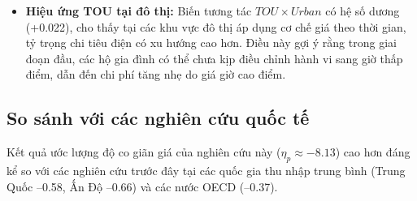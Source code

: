 \documentclass[12pt,a4paper,oneside]{article}
\begin{document}
\begin{itemize}
\begin{figure}[H]
			\caption{Phân tích chi tiết tác động của nhiệt độ và mùa vụ đến tiêu dùng điện}
			\label{fig:climate_impact_comprehensive}
		\end{figure}
		
	\noindent \textit{Nhận xét và đánh giá chi tiết:}
	\begin{itemize}
		\item \textbf{Quan hệ phi tuyến (Hình \ref{fig:temp_relation_nonlinear}):} Đường hồi quy bậc hai (màu đỏ) với khoảng tin cậy 95\% minh họa rõ nét mối quan hệ hình chữ U ngược. Tỷ trọng chi tiêu điện tăng dần khi nhiệt độ tăng, phản ánh nhu cầu làm mát gia tăng.
		
		\item \textbf{Tác động mùa vụ:} Kết quả mô hình cho thấy sự khác biệt rõ rệt giữa mùa khô và mùa mưa. Trong mùa khô, trung vị tỷ trọng chi tiêu điện cao hơn đáng kể, củng cố kết quả hồi quy về biến giả mùa vụ ($D_{dry}$). Điều này hàm ý rằng các chính sách tiết kiệm điện cần được đẩy mạnh đặc biệt vào các tháng cao điểm nắng nóng.
		
		\item \textbf{So sánh theo khu vực (Hình \ref{fig:seasonal_impact}):} Biểu đồ minh họa sự khác biệt giữa các vùng miền. Các khu vực đô thị có mức tăng chi tiêu điện rõ rệt hơn so với nông thôn, phản ánh sự khác biệt về mức độ sử dụng thiết bị làm mát.
	\end{itemize}
		
		\item \textbf{Hiệu ứng TOU tại đô thị:} Biến tương tác $TOU \times Urban$ có hệ số dương (+0.022), cho thấy tại các khu vực đô thị áp dụng cơ chế giá theo thời gian, tỷ trọng chi tiêu điện có xu hướng cao hơn. Điều này gợi ý rằng trong giai đoạn đầu, các hộ gia đình có thể chưa kịp điều chỉnh hành vi sang giờ thấp điểm, dẫn đến chi phí tăng nhẹ do giá giờ cao điểm.
	\end{itemize}
	
	\subsection{So sánh với các nghiên cứu quốc tế}
	Kết quả ước lượng độ co giãn giá của nghiên cứu này ($\eta_p \approx -8.13$) cao hơn đáng kể so với các nghiên cứu trước đây tại các quốc gia thu nhập trung bình (Trung Quốc –0.58, Ấn Độ –0.66) và các nước OECD (–0.37). 
	
\end{document}
